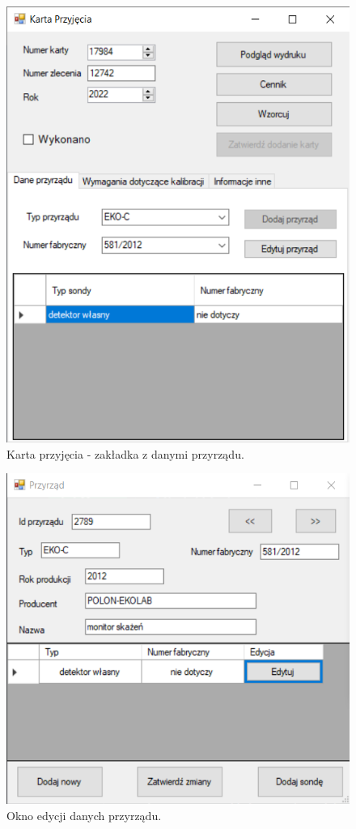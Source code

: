 \begin{figure}[htb]
	\centering
	\includegraphics{obrazki/Biuro/karta/karta_dane_przyrzadu.png}
	\caption{Karta przyjęcia - zakładka z danymi przyrządu.}
	\label{kartaDanePrzyrzadu}
\end{figure}

\begin{figure}[htb]
	\centering
	\includegraphics{obrazki/Biuro/karta/edytuj_przyrzad.png}
	\caption{Okno edycji danych przyrządu.}
	\label{edytujPrzyrzad}
\end{figure}

